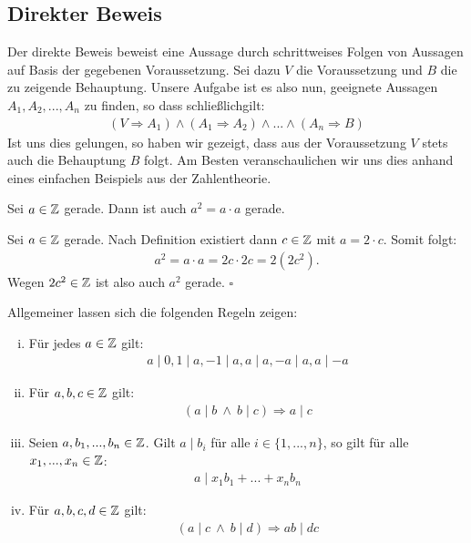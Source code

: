 \subsection{Direkter Beweis}
Der direkte Beweis beweist eine Aussage durch schrittweises Folgen von Aussagen auf Basis der gegebenen Voraussetzung. 
Sei dazu $V$ die Voraussetzung und $B$ die zu zeigende Behauptung. Unsere Aufgabe ist es also nun, geeignete Aussagen $A_1, A_2,...,A_n$ zu finden, 
so dass schließlichgilt: 
\begin{align*}
    (V \Rightarrow A_1) \wedge (A_1 \Rightarrow A_2) \wedge ... \wedge (A_n \Rightarrow B)
\end{align*}
Ist uns dies gelungen, so haben wir gezeigt, dass aus der Voraussetzung $V$ stets auch die Behauptung $B$ folgt. 
Am Besten veranschaulichen wir uns dies anhand eines einfachen Beispiels aus der Zahlentheorie. 
\begin{proposition}
    Sei $a \in \mathbb{Z}$ gerade. Dann ist auch $a^2 = a \cdot a$ gerade. 
\end{proposition}


\begin{proof*}
    Sei $a \in \mathbb{Z}$ gerade. Nach Definition existiert dann $c \in \mathbb{Z}$ mit $a = 2 \cdot c$. Somit folgt: 
    \begin{align*}
        a^2 = a \cdot a = 2c \cdot 2c = 2(2c^2).
    \end{align*}
    Wegen $2c^2 \in \mathbb{Z}$ ist also auch $a^2$ gerade. 
    \hfill $\square$
\end{proof*}

Allgemeiner lassen sich die folgenden Regeln zeigen:

\begin{theorem}
    \begin{enumerate}[(i)]
        \item 
        Für jedes $a \in \mathbb{Z}$ gilt: 
        \begin{align*}
            a \mid 0, 1 \mid a, -1 \mid a, a \mid a, -a \mid a, a \mid -a
        \end{align*}
        \item 
        Für $a,b,c \in \mathbb{Z}$ gilt: 
        \begin{align*}
            (a \mid b \ \wedge \ b \mid c) \Rightarrow a \mid c 
        \end{align*}
        \item 
        Seien $a,b_1,...,b_n \in \mathbb{Z}$. Gilt $a \mid b_i$ für alle $i \in \{1,...,n\}$, so gilt für alle $x_1,...,x_n \in \mathbb{Z}$: 
        \begin{align*}
            a \mid x_1 b_1 + ... + x_n b_n 
        \end{align*}
        \item 
        Für $a,b,c,d \in \mathbb{Z}$ gilt: 
        \begin{align*}
            (a \mid c \ \wedge  \ b \mid d) \Rightarrow ab \mid dc 
        \end{align*}
    \end{enumerate}
\end{theorem}

